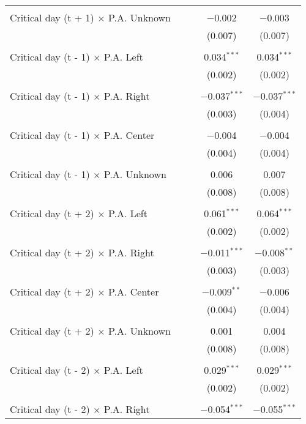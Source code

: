 \documentclass[
]{article}
\begin{document}
\begin{table}[!htbp]
{\begin{tabular}{@{\extracolsep{5pt}}lcccc}
  & & & & \\ 
 Critical day (t + 1) $\times$ P.A. Unknown &  &  & $-$0.002 & $-$0.003 \\ 
  &  &  & (0.007) & (0.007) \\ 
  & & & & \\ 
 Critical day (t - 1) $\times$ P.A. Left &  &  & 0.034$^{***}$ & 0.034$^{***}$ \\ 
  &  &  & (0.002) & (0.002) \\ 
  & & & & \\ 
 Critical day (t - 1) $\times$ P.A. Right &  &  & $-$0.037$^{***}$ & $-$0.037$^{***}$ \\ 
  &  &  & (0.003) & (0.004) \\ 
  & & & & \\ 
 Critical day (t - 1) $\times$ P.A. Center &  &  & $-$0.004 & $-$0.004 \\ 
  &  &  & (0.004) & (0.004) \\ 
  & & & & \\ 
 Critical day (t - 1) $\times$ P.A. Unknown &  &  & 0.006 & 0.007 \\ 
  &  &  & (0.008) & (0.008) \\ 
  & & & & \\ 
 Critical day (t + 2) $\times$ P.A. Left &  &  & 0.061$^{***}$ & 0.064$^{***}$ \\ 
  &  &  & (0.002) & (0.002) \\ 
  & & & & \\ 
 Critical day (t + 2) $\times$ P.A. Right &  &  & $-$0.011$^{***}$ & $-$0.008$^{**}$ \\ 
  &  &  & (0.003) & (0.003) \\ 
  & & & & \\ 
 Critical day (t + 2) $\times$ P.A. Center &  &  & $-$0.009$^{**}$ & $-$0.006 \\ 
  &  &  & (0.004) & (0.004) \\ 
  & & & & \\ 
 Critical day (t + 2) $\times$ P.A. Unknown &  &  & 0.001 & 0.004 \\ 
  &  &  & (0.008) & (0.008) \\ 
  & & & & \\ 
 Critical day (t - 2) $\times$ P.A. Left &  &  & 0.029$^{***}$ & 0.029$^{***}$ \\ 
  &  &  & (0.002) & (0.002) \\ 
  & & & & \\ 
 Critical day (t - 2) $\times$ P.A. Right &  &  & $-$0.054$^{***}$ & $-$0.055$^{***}$ \\ 

\end{tabular}}
\end{table}
\end{document}
